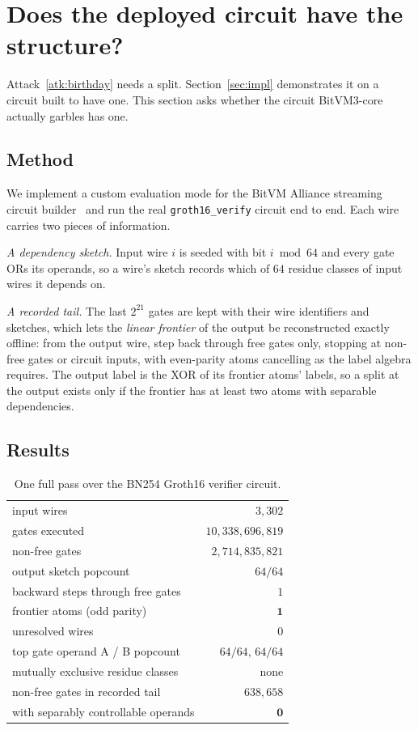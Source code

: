 \documentclass[11pt,a4paper]{article}
\theoremstyle{definition}
\theoremstyle{plain}
\begin{document}
\section{Does the deployed circuit have the structure?}
\label{sec:measure}

Attack~\ref{atk:birthday} needs a split. Section~\ref{sec:impl} demonstrates it
on a circuit built to have one. This section asks whether the circuit BitVM3-core
actually garbles has one.

\subsection{Method}

We implement a custom evaluation mode for the BitVM Alliance streaming circuit
builder~\cite{GSV} and run the real \texttt{groth16\_verify} circuit end to end.
Each wire carries two pieces of information.

\emph{A dependency sketch.} Input wire $i$ is seeded with bit $i \bmod 64$ and
every gate ORs its operands, so a wire's sketch records which of $64$ residue
classes of input wires it depends on.

\emph{A recorded tail.} The last $2^{21}$ gates are kept with their wire
identifiers and sketches, which lets the \emph{linear frontier} of the output be
reconstructed exactly offline: from the output wire, step back through free
gates only, stopping at non-free gates or circuit inputs, with even-parity atoms
cancelling as the label algebra requires. The output label is the XOR of its
frontier atoms' labels, so a split at the output exists only if the frontier has
at least two atoms with separable dependencies.

\subsection{Results}

\begin{table}[t]
\centering
\begin{tabular}{lr}
\toprule
input wires & $3{,}302$ \\
gates executed & $10{,}338{,}696{,}819$ \\
non-free gates & $2{,}714{,}835{,}821$ \\
output sketch popcount & $64/64$ \\
\midrule
backward steps through free gates & $1$ \\
frontier atoms (odd parity) & $\mathbf{1}$ \\
unresolved wires & $0$ \\
\midrule
top gate operand A / B popcount & $64/64$, $64/64$ \\
mutually exclusive residue classes & none \\
\midrule
non-free gates in recorded tail & $638{,}658$ \\
\quad with separably controllable operands & $\mathbf{0}$ \\
\bottomrule
\end{tabular}
\caption{One full pass over the BN254 Groth16 verifier circuit.}
\label{tab:measure}
\end{table}
\end{document}
